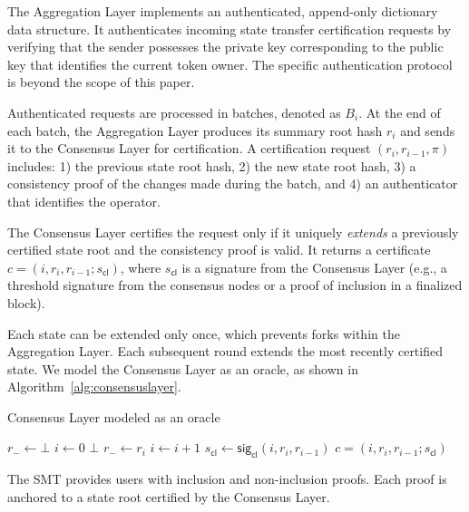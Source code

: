 \documentclass[twocolumn]{article}
\begin{document}
The Aggregation Layer implements an authenticated, append-only dictionary data structure.
It authenticates incoming state transfer certification requests by verifying that the sender possesses the private key corresponding to the public key that identifies the current token owner. The specific authentication protocol is beyond the scope of this paper.

Authenticated requests are processed in batches, denoted as $B_i$. At the end of each batch, the Aggregation Layer produces its summary root hash $r_i$ and sends it to the Consensus Layer for certification. A certification request $(r_i, r_{i-1}, \pi)$ includes: 1) the previous state root hash, 2) the new state root hash, 3) a consistency proof of the changes made during the batch, and 4) an authenticator that identifies the operator.

The Consensus Layer certifies the request only if it uniquely \textit{extends} a previously certified state root and the consistency proof is valid. It returns a certificate $c = (i, r_i, r_{i-1}; s_{\textsf{cl}})$, where $s_{\textsf{cl}}$ is a signature from the Consensus Layer (e.g., a threshold signature from the consensus nodes or a proof of inclusion in a finalized block).

Each state can be extended only once, which prevents forks within the Aggregation Layer. Each subsequent round extends the most recently certified state.
We model the Consensus Layer as an oracle, as shown in Algorithm~\ref{alg:consensuslayer}.

\begin{algorithm}[tbh]
  \caption{Consensus Layer modeled as an oracle}\label{alg:consensuslayer}
  \begin{algorithmic}[0]
        \State $r_- \gets \bot$
        \State $i \gets 0$
    \EndFunction
            \State \Return $\bot$
        \EndIf
        \State $r_- \gets r_i$
        \State $i \gets i+1$
        \State $s_{\textsf{cl}} \gets \textsf{sig}_\textsf{cl}(i, r_i, r_{i-1})$
        \State \Return $c = (i, r_i, r_{i-1}; s_{\textsf{cl}})$
    \EndFunction
  \end{algorithmic}
\end{algorithm}


The SMT provides users with inclusion and non-inclusion proofs. Each proof is anchored to a state root certified by the Consensus Layer.
\end{document}
